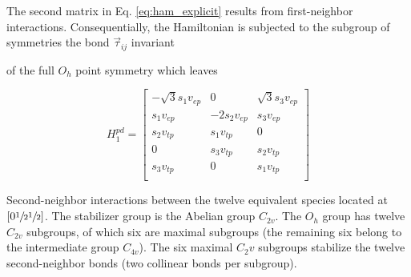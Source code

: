\documentclass[twocolumn,showpacs,preprintnumbers,superscriptaddress,prb,floatfix,aps,10pt]{revtex4-1}
\newcommand*{\bondvec}{\vec{\tau}_{ij}}
\begin{document}
The second matrix in Eq. \ref{eq:ham_explicit} results from first-neighbor interactions. Consequentially, the Hamiltonian is subjected to the subgroup of symmetries  the bond $\bondvec$ invariant 

of the full $O_h$ point symmetry which leaves


\begin{equation}
H_1^{pd} = 
\begin{bmatrix}
-\sqrt{3} s_1 v_{ep} & 0            & \sqrt{3} s_3 v_{ep}  \\ %
 s_1 v_{ep}          &-2 s_2 v_{ep} &  s_3 v_{ep}          \\ %
 s_2 v_{tp}          &  s_1 v_{tp}  & 0                    \\
0                    &  s_3 v_{tp}  &  s_2 v_{tp}          \\
 s_3 v_{tp}          & 0            &  s_1 v_{tp}          \\
\end{bmatrix}
\end{equation}

Second-neighbor interactions between the twelve equivalent species located at $\left[0\sfrac{1}{2}\sfrac{1}{2}\right]$. The stabilizer group is the Abelian group $C_{2v}$. The $O_h$ group has twelve $C_{2v}$ subgroups, of which six are maximal subgroups (the remaining six belong to the intermediate group $C_{4v}$). \cite{wadhawan_introduction_2000} The six maximal $C_2v$ subgroups stabilize the twelve second-neighbor bonds (two collinear bonds per subgroup). 
\end{document}
